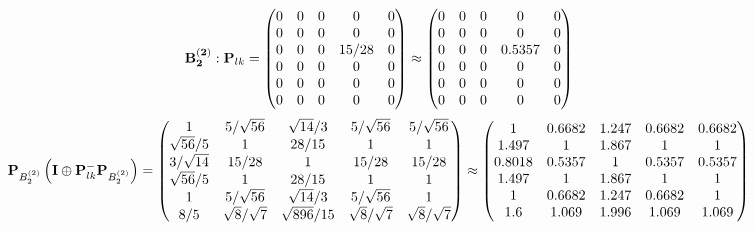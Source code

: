 \documentclass[10pt,a4paper]{article}
\begin{document}
	\[
		\bold{B_2^{(2)}}: \bold{P}_{lk} = 
		\begin{pmatrix}
			{{0}}{} & {{0}}{} & {{0}}{} & {{0}}{} & {{0}}{} \\
			{{0}}{} & {{0}}{} & {{0}}{} & {{0}}{} & {{0}}{} \\
			{{0}}{} & {{0}}{} & {{0}}{} & {{15}} / {{28}} & {{0}}{} \\
			{{0}}{} & {{0}}{} & {{0}}{} & {{0}}{} & {{0}}{} \\
			{{0}}{} & {{0}}{} & {{0}}{} & {{0}}{} & {{0}}{} \\
			{{0}}{} & {{0}}{} & {{0}}{} & {{0}}{} & {{0}}{} \\
		\end{pmatrix}
		\approx
		\begin{pmatrix}
			0        & 0        & 0        & 0        & 0        \\
			0        & 0        & 0        & 0        & 0        \\
			0        & 0        & 0        & 0.5357   & 0        \\
			0        & 0        & 0        & 0        & 0        \\
			0        & 0        & 0        & 0        & 0        \\
			0        & 0        & 0        & 0        & 0        \\
		\end{pmatrix}
	\]
	\[
		\bold{P}_{B_2^{(2)}}\left(\bold{I} \oplus \bold{P}_{lk}^{-}\bold{P}_{B_2^{(2)}}\right) = 
		\begin{pmatrix}
			{1}{} & {{5}} / {\sqrt{56}} & {\sqrt{14}} / {{3}} & {{5}} / {\sqrt{56}} & {{5}} / {\sqrt{56}} \\
			{\sqrt{56}} / {{5}} & {1}{} & {{28}} / {{15}} & {1}{} & {1}{} \\
			{{3}} / {\sqrt{14}} & {{15}} / {{28}} & {1}{} & {{15}} / {{28}} & {{15}} / {{28}} \\
			{\sqrt{56}} / {{5}} & {1}{} & {{28}} / {{15}} & {1}{} & {1}{} \\
			{1}{} & {{5}} / {\sqrt{56}} & {\sqrt{14}} / {{3}} & {{5}} / {\sqrt{56}} & {1}{} \\
			{{8}} / {{5}} & {\sqrt{8}} / {\sqrt{7}} & {\sqrt{896}} / {{15}} & {\sqrt{8}} / {\sqrt{7}} & {\sqrt{8}} / {\sqrt{7}} \\
		\end{pmatrix}
		\approx
		\begin{pmatrix}
			1        & 0.6682   & 1.247    & 0.6682   & 0.6682   \\
			1.497    & 1        & 1.867    & 1        & 1        \\
			0.8018   & 0.5357   & 1        & 0.5357   & 0.5357   \\
			1.497    & 1        & 1.867    & 1        & 1        \\
			1        & 0.6682   & 1.247    & 0.6682   & 1        \\
			1.6      & 1.069    & 1.996    & 1.069    & 1.069    \\
		\end{pmatrix}
	\]
\end{document}
